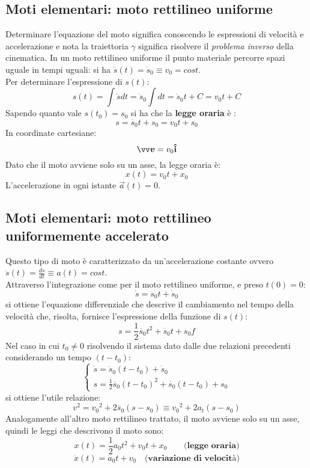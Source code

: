 \subsection*{Moti elementari: moto rettilineo uniforme}
Determinare  l'equazione del moto significa conoscendo le espressioni di  velocità e accelerazione e nota la traiettoria 
$\gamma $ significa risolvere il \emph{problema inverso} della cinematica.
In un moto rettilineo uniforme il punto materiale percorre spazi uguale in tempi uguali: si ha $\dot{s}(t) = \dot{s}_0
\equiv v_0 = cost$. \\
Per determinare l'espressione di $s(t)$:
\[
s(t) = \int \dot{s} dt = \dot{s}_0 \int dt = \dot{s}_0 t + C = v_0 t + C
\]
Sapendo quanto vale $s(t_0)= s_0$ si ha che la \textbf{legge oraria} è :
\[
   s = \dot{s_0}t + s_0 = v_0 t + s_0    
\]
In coordinate cartesiane:
\[
  \vec{v} = v_0 \v{i}     
\]
Dato che il moto avviene solo su un asse, la legge oraria è:
\[
  x(t) = v_0 t + x_0    
\]
L'accelerazione in ogni istante $\vec{a}(t) = 0$. 




\subsection*{Moti elementari: moto rettilineo uniformemente accelerato}

Questo tipo di moto è caratterizzato da un'accelerazione costante ovvero $\ddot{s}(t)
= \frac{d\dot{s}}{dt} \equiv a(t) = cost$. \\
Attraverso l'integrazione come per il moto rettilineo uniforme, e preso $t(0)= 0$:
\[
  \dot{s}= \ddot{s}_0t + \dot{s}_0    
\]
si ottiene l'equazione differenziale che descrive il cambiamento nel tempo della 
velocità che, risolta, fornisce l'espressione della funzione di $s(t)$:
\[
s = \frac{1}{2}\ddot{s_0}t^2 + \dot{s_0}t + s_0f    
\]
Nel caso in cui $t_0 \neq 0$ risolvendo il sistema dato dalle due relazioni precedenti considerando 
un tempo $(t-t_0)$:
\[
\begin{cases}

    \dot{s}= \ddot{s}_0(t-t_0) + \dot{s}_0    \\
    s = \frac{1}{2}\ddot{s_0}(t-t_0)^2 + \dot{s_0}(t-t_0) + s_0   

\end{cases}    
\]
si ottiene l'utile relazione:
\[
v^2 = {v_0}^2 + 2 \ddot{s_0}(s-s_0) \equiv {v_0}^2 + 2 a_t(s-s_0)   
\]
Analogamente all'altro moto rettilineo trattato, il moto avviene solo su un asse, quindi le leggi
che descrivono il moto sono:
\[
    x(t) = \frac{1}{2}a_0t^2 + v_0t + x_0   \qquad \textbf{(legge oraria)}
\]
\[
   \dot{x}(t) = a_0t + v_0 \quad \textbf{(variazione di velocità)}
\]


